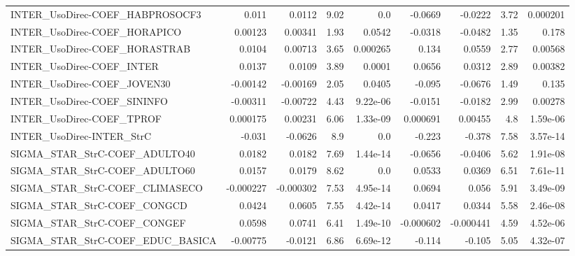 \begin{tabular}{lrrrrrrrr}
INTER\_UsoDirec-COEF\_HABPROSOCF3      &       0.011 &       0.0112 &    9.02 &      0.0 &    -0.0669 &     -0.0222 &         3.72 &      0.000201 \\
INTER\_UsoDirec-COEF\_HORAPICO         &     0.00123 &      0.00341 &    1.93 &   0.0542 &    -0.0318 &     -0.0482 &         1.35 &         0.178 \\
INTER\_UsoDirec-COEF\_HORASTRAB        &      0.0104 &      0.00713 &    3.65 & 0.000265 &      0.134 &      0.0559 &         2.77 &       0.00568 \\
INTER\_UsoDirec-COEF\_INTER            &      0.0137 &       0.0109 &    3.89 &   0.0001 &     0.0656 &      0.0312 &         2.89 &       0.00382 \\
INTER\_UsoDirec-COEF\_JOVEN30          &    -0.00142 &     -0.00169 &    2.05 &   0.0405 &     -0.095 &     -0.0676 &         1.49 &         0.135 \\
INTER\_UsoDirec-COEF\_SININFO          &    -0.00311 &     -0.00722 &    4.43 & 9.22e-06 &    -0.0151 &     -0.0182 &         2.99 &       0.00278 \\
INTER\_UsoDirec-COEF\_TPROF            &    0.000175 &      0.00231 &    6.06 & 1.33e-09 &   0.000691 &     0.00455 &          4.8 &      1.59e-06 \\
INTER\_UsoDirec-INTER\_StrC            &      -0.031 &      -0.0626 &     8.9 &      0.0 &     -0.223 &      -0.378 &         7.58 &      3.57e-14 \\
SIGMA\_STAR\_StrC-COEF\_ADULTO40        &      0.0182 &       0.0182 &    7.69 & 1.44e-14 &    -0.0656 &     -0.0406 &         5.62 &      1.91e-08 \\
SIGMA\_STAR\_StrC-COEF\_ADULTO60        &      0.0157 &       0.0179 &    8.62 &      0.0 &     0.0533 &      0.0369 &         6.51 &      7.61e-11 \\
SIGMA\_STAR\_StrC-COEF\_CLIMASECO       &   -0.000227 &    -0.000302 &    7.53 & 4.95e-14 &     0.0694 &       0.056 &         5.91 &      3.49e-09 \\
SIGMA\_STAR\_StrC-COEF\_CONGCD          &      0.0424 &       0.0605 &    7.55 & 4.42e-14 &     0.0417 &      0.0344 &         5.58 &      2.46e-08 \\
SIGMA\_STAR\_StrC-COEF\_CONGEF          &      0.0598 &       0.0741 &    6.41 & 1.49e-10 &  -0.000602 &   -0.000441 &         4.59 &      4.52e-06 \\
SIGMA\_STAR\_StrC-COEF\_EDUC\_BASICA     &    -0.00775 &      -0.0121 &    6.86 & 6.69e-12 &     -0.114 &      -0.105 &         5.05 &      4.32e-07 \\

\end{tabular}
